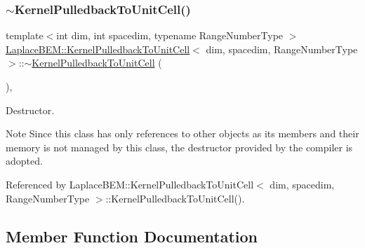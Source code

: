 \subsubsection{\texorpdfstring{$\sim$\+Kernel\+Pulledback\+To\+Unit\+Cell()}{~KernelPulledbackToUnitCell()}}
{\footnotesize\ttfamily template$<$int dim, int spacedim, typename Range\+Number\+Type $>$ \\
\hyperlink{classLaplaceBEM_1_1KernelPulledbackToUnitCell}{Laplace\+B\+E\+M\+::\+Kernel\+Pulledback\+To\+Unit\+Cell}$<$ dim, spacedim, Range\+Number\+Type $>$\+::$\sim$\hyperlink{classLaplaceBEM_1_1KernelPulledbackToUnitCell}{Kernel\+Pulledback\+To\+Unit\+Cell} (\begin{DoxyParamCaption}{ }\end{DoxyParamCaption})\hspace{0.3cm}{\ttfamily [virtual]}, {\ttfamily [default]}}

Destructor.


\begin{DoxyDescription}
\item[Note ]Since this class has only references to other objects as its members and their memory is not managed by this class, the destructor provided by the compiler is adopted. 
\end{DoxyDescription}

Referenced by Laplace\+B\+E\+M\+::\+Kernel\+Pulledback\+To\+Unit\+Cell$<$ dim, spacedim, Range\+Number\+Type $>$\+::\+Kernel\+Pulledback\+To\+Unit\+Cell().



\subsection{Member Function Documentation}
\mbox{\label{classLaplaceBEM_1_1KernelPulledbackToUnitCell_a6c4063a68f9981ed1f2327670c512f59}} 
